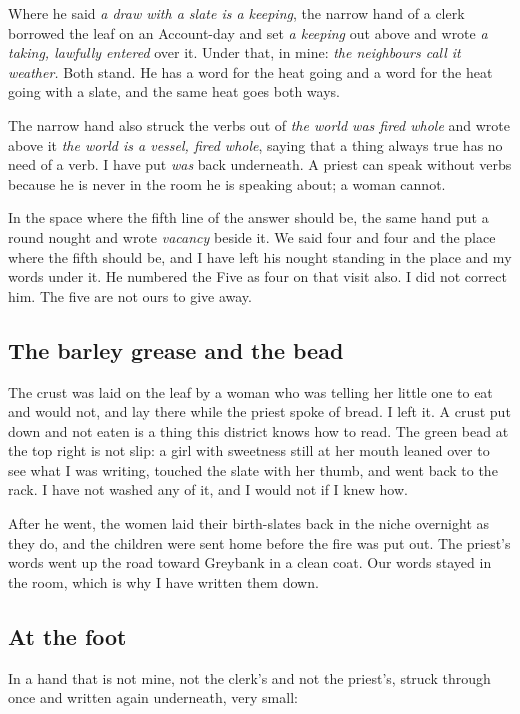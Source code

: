 \documentclass{design/chronicle}
\begin{document}
Where he said \emph{a draw with a slate is a keeping}, the narrow hand of a clerk borrowed the leaf on an Account-day and set \emph{a keeping} out above and wrote \emph{a taking, lawfully entered} over it. Under that, in mine: \emph{the neighbours call it weather.} Both stand. He has a word for the heat going and a word for the heat going with a slate, and the same heat goes both ways.

The narrow hand also struck the verbs out of \emph{the world was fired whole} and wrote above it \emph{the world is a vessel, fired whole}, saying that a thing always true has no need of a verb. I have put \emph{was} back underneath. A priest can speak without verbs because he is never in the room he is speaking about; a woman cannot.

In the space where the fifth line of the answer should be, the same hand put a round nought and wrote \emph{vacancy} beside it. We said four and four and the place where the fifth should be, and I have left his nought standing in the place and my words under it. He numbered the Five as four on that visit also. I did not correct him. The five are not ours to give away.

\subsection*{The barley grease and the bead}

The crust was laid on the leaf by a woman who was telling her little one to eat and would not, and lay there while the priest spoke of bread. I left it. A crust put down and not eaten is a thing this district knows how to read. The green bead at the top right is not slip: a girl with sweetness still at her mouth leaned over to see what I was writing, touched the slate with her thumb, and went back to the rack. I have not washed any of it, and I would not if I knew how.

After he went, the women laid their birth-slates back in the niche overnight as they do, and the children were sent home before the fire was put out. The priest’s words went up the road toward Greybank in a clean coat. Our words stayed in the room, which is why I have written them down.

\subsection*{At the foot}

In a hand that is not mine, not the clerk’s and not the priest’s, struck through once and written again underneath, very small:
\end{document}
